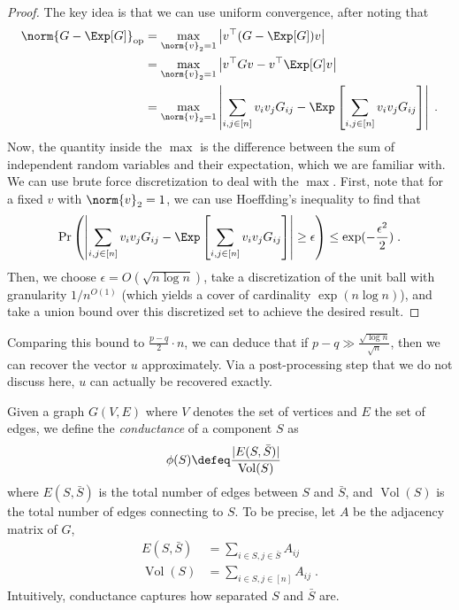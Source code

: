 \begin{proof}
The key idea is that we can use uniform convergence, after noting that
\begin{align}
    \norm{ G - \Exp[G] }_{\mathrm{op}} &= \max_{\norm{ v }_2 = 1} \left\vert v^\top (G - \Exp[G]) v \right\vert \\
    &= \max_{\norm{ v }_2 = 1} \left\vert v^\top G v - v^\top \Exp[G] v \right\vert \\
    &= \max_{\norm{ v }_2 = 1} \left\vert \sum_{i, j \in [n]} v_i v_j G_{ij} - \Exp \left[ \sum_{i, j \in [n]} v_i v_j G_{ij} \right] \right\vert \;.
\end{align}
Now, the quantity inside the $\max$ is the difference between the sum of independent random variables and their expectation, which we are familiar with. We can use brute force discretization to deal with the $\max$. First, note that for a fixed $v$ with $\norm{ v }_2 = 1$, we can use Hoeffding's inequality to find that
\begin{align}
    \Pr \left( \left\vert \sum_{i, j \in [n]} v_i v_j G_{ij} - \Exp \left[ \sum_{i, j \in [n]} v_i v_j G_{ij} \right] \right\vert \geq \epsilon \right) \leq \exp(-\frac{\epsilon^2}{2}) \;.
\end{align}
Then, we choose $\epsilon = O(\sqrt{n \log n})$, take a discretization of the unit ball with granularity $1/n^{O(1)}$ (which yields a cover of cardinality  $\exp(n \log n)$), and take a union bound over this discretized set to achieve the desired result.
\end{proof}

\begin{remark}
Comparing this bound to $\frac{p - q}{2} \cdot n$, we can deduce that if $p - q \gg \frac{\sqrt{\log n}}{\sqrt{n}}$, then we can recover the vector $u$ approximately. Via a post-processing step that we do not discuss here, $u$ can actually be recovered exactly. 
\end{remark}

\label{subsec:clustering_worst_graph}


Given a graph $G(V, E)$ where $V$ denotes the set of vertices and $E$ the set of edges, we define the {\it conductance} of a component $S$ as
\begin{align}
    \phi(S) &\defeq \frac{\vert E(S, \bar{S}) \vert}{\operatorname{Vol}(S)}
\end{align}
where $E(S, \bar{S})$ is the total number of edges between $S$ and $\bar{S}$, and $\operatorname{Vol}(S)$ is the total number of edges connecting to $S$. To be precise, let $A$ be the adjacency matrix of $G$, 
\begin{align}
    E(S, \bar{S}) &= \sum_{i \in S, j \in \bar{S}} A_{ij} \\
    \operatorname{Vol}(S) &= \sum_{i \in S, j \in [n]} A_{ij} \;.
\end{align}
Intuitively, conductance captures how separated $S$ and $\bar{S}$ are. 

